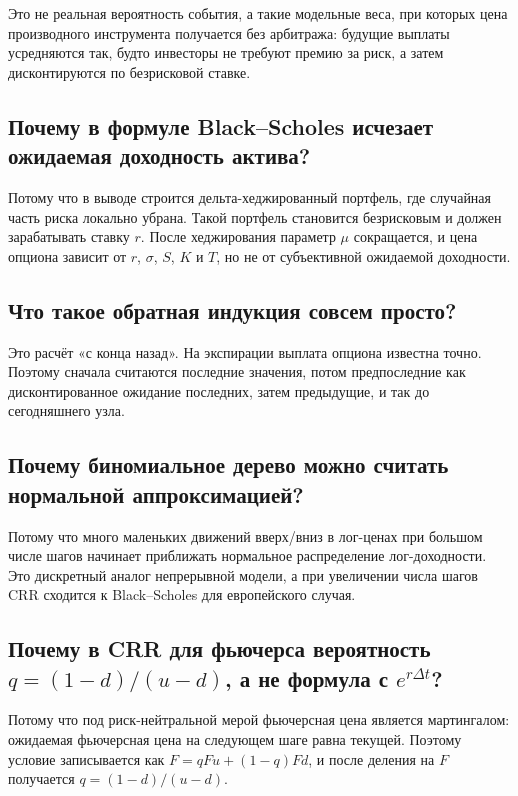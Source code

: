 \documentclass[11pt,a4paper]{article}
\begin{document}
Это не реальная вероятность события, а такие модельные веса, при которых цена производного инструмента получается без арбитража: будущие выплаты усредняются так, будто инвесторы не требуют премию за риск, а затем дисконтируются по безрисковой ставке.

\subsection*{Почему в формуле Black--Scholes исчезает ожидаемая доходность актива?}

Потому что в выводе строится дельта-хеджированный портфель, где случайная часть риска локально убрана. Такой портфель становится безрисковым и должен зарабатывать ставку $r$. После хеджирования параметр $\mu$ сокращается, и цена опциона зависит от $r$, $\sigma$, $S$, $K$ и $T$, но не от субъективной ожидаемой доходности.

\subsection*{Что такое обратная индукция совсем просто?}

Это расчёт «с конца назад». На экспирации выплата опциона известна точно. Поэтому сначала считаются последние значения, потом предпоследние как дисконтированное ожидание последних, затем предыдущие, и так до сегодняшнего узла.

\subsection*{Почему биномиальное дерево можно считать нормальной аппроксимацией?}

Потому что много маленьких движений вверх/вниз в лог-ценах при большом числе шагов начинает приближать нормальное распределение лог-доходности. Это дискретный аналог непрерывной модели, а при увеличении числа шагов CRR сходится к Black--Scholes для европейского случая.

\subsection*{Почему в CRR для фьючерса вероятность $q=(1-d)/(u-d)$, а не формула с $e^{r\Delta t}$?}

Потому что под риск-нейтральной мерой фьючерсная цена является мартингалом: ожидаемая фьючерсная цена на следующем шаге равна текущей. Поэтому условие записывается как $F=qFu+(1-q)Fd$, и после деления на $F$ получается $q=(1-d)/(u-d)$.
\end{document}
